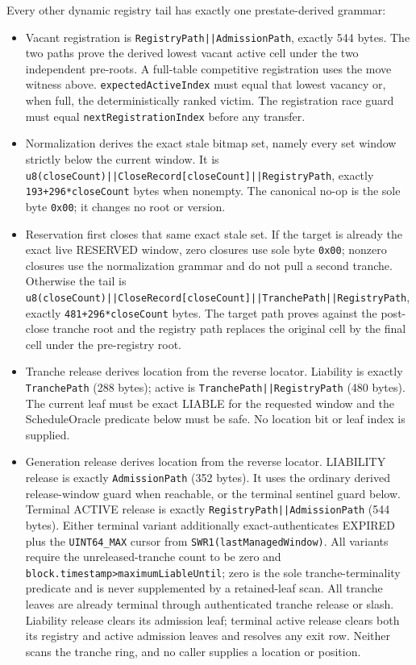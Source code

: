 \documentclass[a4paper,11pt]{article}
\newcommand{\code}[1]{\nolinkurl{#1}}
\begin{document}
Every other dynamic registry tail has exactly one prestate-derived grammar:
\begin{itemize}
\item Vacant registration is \code{RegistryPath||AdmissionPath}, exactly 544
bytes.  The two paths prove the derived lowest vacant active cell under the two
independent pre-roots.  A full-table competitive registration uses the move
witness above.  \code{expectedActiveIndex} must equal that lowest vacancy or,
when full, the deterministically ranked victim.  The registration race guard
must equal \code{nextRegistrationIndex} before any transfer.
\item Normalization derives the exact stale bitmap set, namely every set window
strictly below the current window.  It is
\code{u8(closeCount)||CloseRecord[closeCount]||RegistryPath}, exactly
\code{193+296*closeCount} bytes when nonempty.  The canonical no-op is the sole
byte \code{0x00}; it changes no root or version.
\item Reservation first closes that same exact stale set.  If the target is
already the exact live RESERVED window, zero closures use sole byte
\code{0x00}; nonzero closures use the normalization grammar and do not pull a
second tranche.  Otherwise the tail is
\code{u8(closeCount)||CloseRecord[closeCount]||TranchePath||RegistryPath},
exactly \code{481+296*closeCount} bytes.  The target path proves against the
post-close tranche root and the registry path replaces the original cell by
the final cell under the pre-registry root.
\item Tranche release derives location from the reverse locator.  Liability is
exactly \code{TranchePath} (288 bytes); active is
\code{TranchePath||RegistryPath} (480 bytes).  The current leaf must be exact
LIABLE for the requested window and the ScheduleOracle predicate below must be
safe.  No location bit or leaf index is supplied.
\item Generation release derives location from the reverse locator.
LIABILITY release is exactly \code{AdmissionPath} (352 bytes).  It uses the
ordinary derived release-window guard when reachable, or the terminal sentinel
guard below.  Terminal ACTIVE release is exactly
\code{RegistryPath||AdmissionPath} (544 bytes).  Either terminal variant
additionally exact-authenticates EXPIRED plus the \code{UINT64_MAX} cursor
from \code{SWR1(lastManagedWindow)}.  All variants require the unreleased-tranche
count to be zero and \code{block.timestamp>maximumLiableUntil}; zero is the
sole tranche-terminality predicate and is never supplemented by a retained-leaf
scan.  All tranche leaves are already terminal through authenticated tranche
release or slash.  Liability release
clears its admission leaf; terminal active release clears both its registry and
active admission leaves and resolves any exit row.  Neither scans the tranche
ring, and no caller supplies a location or position.
\end{itemize}
\end{document}
